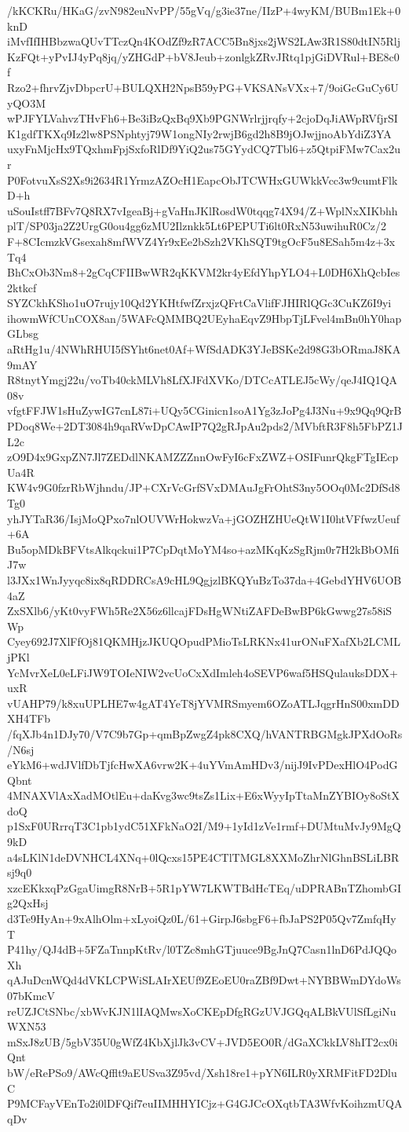 /kKCKRu/HKaG/zvN982euNvPP/55gVq/g3ie37ne/IIzP+4wyKM/BUBm1Ek+0knD
iMvfIfIHBbzwaQUvTTczQn4KOdZf9zR7ACC5Bn8jxs2jWS2LAw3R1S80dtIN5Rlj
KzFQt+yPvIJ4yPq8jq/yZHGdP+bV8Jeub+zonlgkZRvJRtq1pjGiDVRul+BE8c0f
Rzo2+fhrvZjvDbpcrU+BULQXH2NpsB59yPG+VKSANsVXx+7/9oiGcGuCy6UyQO3M
wPJFYLVahvzTHvFh6+Be3iBzQxBq9Xb9PGNWrlrjjrqfy+2cjoDqJiAWpRVfjrSI
K1gdfTKXq9Iz2lw8PSNphtyj79W1ongNIy2rwjB6gd2h8B9jOJwjjnoAbYdiZ3YA
uxyFnMjcHx9TQxhmFpjSxfoRlDf9YiQ2us75GYydCQ7Tbl6+z5QtpiFMw7Cax2ur
P0FotvuXsS2Xs9i2634R1YrmzAZOcH1EapcObJTCWHxGUWkkVcc3w9cumtFlkD+h
uSouIstff7BFv7Q8RX7vIgeaBj+gVaHnJKlRosdW0tqqg74X94/Z+WplNxXIKbhh
plT/SP03ja2Z2UrgG0ou4gg6zMU2Ilznkk5Lt6PEPUTi6lt0RxN53uwihuR0Cz/2
F+8CIcmzkVGsexah8mfWVZ4Yr9xEe2bSzh2VKhSQT9tgOcF5u8ESah5m4z+3xTq4
BhCxOb3Nm8+2gCqCFIIBwWR2qKKVM2kr4yEfdYhpYLO4+L0DH6XhQcbIes2ktkcf
SYZCkhKSho1uO7rujy10Qd2YKHtfwfZrxjzQFrtCaVlifFJHIRlQGc3CuKZ6I9yi
ihowmWfCUnCOX8an/5WAFcQMMBQ2UEyhaEqvZ9HbpTjLFvel4mBn0hY0hapGLbsg
aRtHg1u/4NWhRHUI5fSYht6net0Af+WfSdADK3YJeBSKe2d98G3bORmaJ8KA9mAY
R8tnytYmgj22u/voTb40ckMLVh8LfXJFdXVKo/DTCcATLEJ5cWy/qeJ4IQ1QA08v
vfgtFFJW1sHuZywIG7cnL87i+UQy5CGinicn1soA1Yg3zJoPg4J3Nu+9x9Qq9QrB
PDoq8We+2DT3084h9qaRVwDpCAwIP7Q2gRJpAu2pds2/MVbftR3F8h5FbPZ1JL2c
zO9D4x9GxpZN7Jl7ZEDdlNKAMZZZnnOwFyI6cFxZWZ+OSIFunrQkgFTgIEcpUa4R
KW4v9G0fzrRbWjhndu/JP+CXrVcGrfSVxDMAuJgFrOhtS3ny5OOq0Mc2DfSd8Tg0
yhJYTaR36/IsjMoQPxo7nlOUVWrHokwzVa+jGOZHZHUeQtW1I0htVFfwzUeuf+6A
Bu5opMDkBFVtsAlkqckui1P7CpDqtMoYM4so+azMKqKzSgRjm0r7H2kBbOMfiJ7w
l3JXx1WnJyyqc8ix8qRDDRCsA9cHL9QgjzlBKQYuBzTo37da+4GebdYHV6UOB4aZ
ZxSXlb6/yKt0vyFWh5Re2X56z6llcajFDsHgWNtiZAFDeBwBP6kGwwg27s58iSWp
Cyey692J7XlFfOj81QKMHjzJKUQOpudPMioTsLRKNx41urONuFXafXb2LCMLjPKl
YcMvrXeL0eLFiJW9TOIeNIW2vcUoCxXdImleh4oSEVP6waf5HSQulauksDDX+uxR
vUAHP79/k8xuUPLHE7w4gAT4YeT8jYVMRSmyem6OZoATLJqgrHnS00xmDDXH4TFb
/fqXJb4n1DJy70/V7C9b7Gp+qmBpZwgZ4pk8CXQ/hVANTRBGMgkJPXdOoRs/N6sj
eYkM6+wdJVlfDbTjfcHwXA6vrw2K+4uYVmAmHDv3/nijJ9IvPDexHlO4PodGQbnt
4MNAXVlAxXadMOtlEu+daKvg3wc9tsZs1Lix+E6xWyyIpTtaMnZYBIOy8oStXdoQ
p1SxF0URrrqT3C1pb1ydC51XFkNaO2I/M9+1yId1zVe1rmf+DUMtuMvJy9MgQ9kD
a4sLKlN1deDVNHCL4XNq+0lQcxs15PE4CTlTMGL8XXMoZhrNlGhnBSLiLBRsj9q0
xzcEKkxqPzGgaUimgR8NrB+5R1pYW7LKWTBdHcTEq/uDPRABnTZhombGIg2QxHsj
d3Te9HyAn+9xAlhOlm+xLyoiQz0L/61+GirpJ6sbgF6+fbJaPS2P05Qv7ZmfqHyT
P41hy/QJ4dB+5FZaTnnpKtRv/l0TZc8mhGTjuuce9BgJnQ7Casn1lnD6PdJQQoXh
qAJuDcnWQd4dVKLCPWiSLAIrXEUf9ZEoEU0raZBf9Dwt+NYBBWmDYdoWs07bKmcV
reUZJCtSNbc/xbWvKJN1lIAQMwsXoCKEpDfgRGzUVJGQqALBkVUlSfLgiNuWXN53
mSxJ8zUB/5gbV35U0gWfZ4KbXjlJk3vCV+JVD5EO0R/dGaXCkkLV8hIT2cx0iQnt
bW/eRePSo9/AWcQfflt9aEUSva3Z95vd/Xsh18re1+pYN6ILR0yXRMFitFD2DluC
P9MCFayVEnTo2i0lDFQif7euIIMHHYICjz+G4GJCcOXqtbTA3WfvKoihzmUQAqDv
